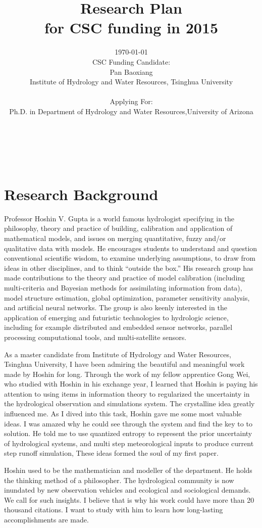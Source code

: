 \documentclass[a4paper, 12pt]{scrartcl}
\author{\today
\vspace*{1.99cm}\\
\large{CSC Funding Candidate:\hfill\phantom{.}}\\
\large{Pan Baoxiang}\\
\small Institute of Hydrology and Water Resources, Tsinghua University \hfill \\
 \\[1.99cm]
\large{Applying For:\sqz}\\
\small{Ph.D. in Department of Hydrology and Water Resources,University of Arizona}\sqz\\[-0.2cm] \small{}\sqz\\[0.3cm]
\normalsize{ }\sqz\\[1cm]
\large{ \hfill\phantom{.}}\\
\large{ }\\[2cm]
}
\date{}
\title{Research Plan\\ \large for CSC funding in 2015}
\begin{document}
\begin{titlepage}
\maketitle  
\thispagestyle{empty}
\end{titlepage}
\addtocounter{page}{-1}
\section{Research Background}


Professor Hoshin V. Gupta is a world famous hydrologist specifying in the philosophy, theory and practice of building, calibration and application of mathematical models, and issues on merging quantitative, fuzzy and/or qualitative data with models. He encourages students to understand and question conventional scientific wisdom, to examine underlying assumptions, to draw from ideas in other disciplines, and to think “outside the box.” His research group  has made contributions to the theory and practice of model calibration (including multi-criteria and Bayesian methods for assimilating information from data), model structure estimation, global optimization, parameter sensitivity analysis, and artificial neural networks. The group is also keenly interested in the application of emerging and futuristic technologies to hydrologic science, including for example distributed and embedded sensor networks, parallel processing computational tools, and multi-satellite sensors.

As a master candidate from Institute of Hydrology and Water Resources, Tsinghua University, I have been admiring the beautiful and meaningful work made by Hoshin for long. Through the work of my fellow apprentice Gong Wei, who studied with Hoshin in his exchange year, I learned that Hoshin is paying his attention to using items in information theory to regularized the uncertainty in the hydrological observation and simulations system. The crystalline idea greatly influenced me. As I dived into this task, Hoshin gave me some most valuable ideas. I was amazed why he could see through the system and find the 
key to to solution. He told me to use quantized entropy to represent the prior uncertainty of hydrological systems, and multi step meteorological inputs to produce current step runoff simulation, These ideas formed the soul of my first paper. 

Hoshin used to be the mathematician and modeller of the department. He holds the thinking method of a philosopher. The hydrological community is now inundated by new observation vehicles and ecological and sociological demands. We call for such insights. I believe that is why his work could have more than 20 thousand citations. I want to study with him to learn how long-lasting accomplishments  are made. 
\end{document}
